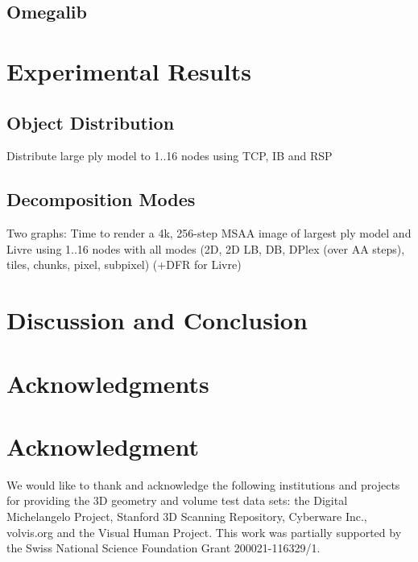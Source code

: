 \documentclass[10pt,journal,compsoc]{IEEEtran}
\begin{document}
\subsection{Omegalib}

\section{Experimental Results}
\label{SEC_results}

\subsection{Object Distribution}

Distribute large ply model to 1..16 nodes using TCP, IB and RSP

\subsection{Decomposition Modes}

Two graphs: Time to render a 4k, 256-step MSAA image of largest ply model and
Livre using 1..16 nodes with all modes (2D, 2D LB, DB, DPlex (over AA steps),
tiles, chunks, pixel, subpixel) (+DFR for Livre)

\section{Discussion and Conclusion}
\label{SEC_conclusions}


\appendices
\ifCLASSOPTIONcompsoc
  \section*{Acknowledgments}
\else
  \section*{Acknowledgment}
\fi
We would like to thank and acknowledge the following institutions and projects
for providing the 3D geometry and volume test data sets: the Digital
Michelangelo Project, Stanford 3D Scanning Repository, Cyberware Inc.,
volvis.org and the Visual Human Project.  This work was partially supported by
the Swiss National Science Foundation Grant 200021-116329/1.
\end{document}
